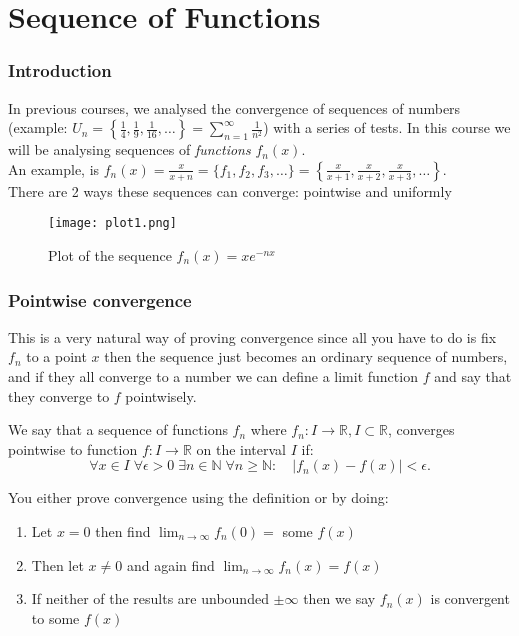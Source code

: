 \part{Sequence of Functions}


\section{Introduction}

In previous courses, we analysed the convergence of sequences of numbers (example: $U_n = \left\{ \frac{1}{4},\frac{1}{9},\frac{1}{16},\ldots \right\} =\sum_{n=1}^{\infty} \frac{1}{n^2} $) with a series of tests. In this course we will be analysing sequences of \emph{functions} $f_n(x)$.\\
An example, is $f_n(x)=\frac{x}{x+n} =\{f_1,f_2,f_3,\ldots\}  =\left\{ \frac{x}{x+1},\frac{x}{x+2},\frac{x}{x+3},\ldots \right\}$.\\

There are 2 ways these sequences can converge: pointwise and uniformly

\begin{figure}[H]
	\centering
	\texttt{[image: plot1.png]}
	\caption*{Plot of the sequence $f_n(x)=xe^{-nx}$}
	\label{fig:plot}
\end{figure}

\section{Pointwise convergence}

This is a very natural way of proving convergence since all you have to do is fix $f_n$ to a point $x$ then the sequence just becomes an ordinary sequence of numbers, and if they all converge to a number we can define a limit function $f$ and say that they converge to $f$ pointwisely.

\begin{definition}
	We say that a sequence of functions $f_n$ where $f_n:I \to \mathbb{R},I\subset \mathbb{R}$, converges pointwise to function $f:I\to \mathbb{R}$ on the interval $I$ if:
	\[
		\forall x\in I \; \forall \epsilon >0 \; \exists n\in \mathbb{N} \; \forall n\ge \mathbb{N}: \quad \left| f_n(x)-f(x) \right|<\epsilon
		.\]
\end{definition}
You either prove convergence using the definition or by doing:
\begin{enumerate}
	\item Let $x=0$ then find $\lim_{n \to \infty} f_n(0)=$ some $f(x)$
	\item Then let $x\neq 0$ and again find $\lim_{n \to \infty} f_n(x)=f(x)$
	\item If neither of the results are unbounded $\pm \infty$ then we say $f_n(x)$ is convergent to some $f(x)$
\end{enumerate}


